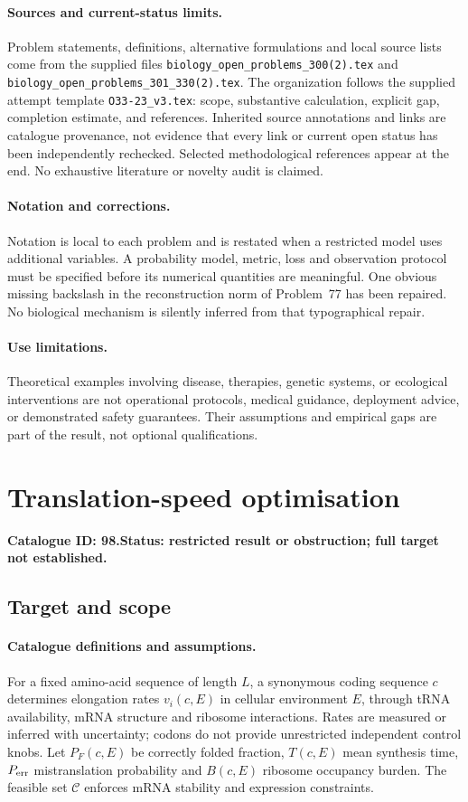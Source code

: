 \documentclass[11pt]{article}
\begin{document}
\paragraph{Sources and current-status limits.}
Problem statements, definitions, alternative formulations and local source lists
come from the supplied files
\texttt{biology\_open\_problems\_300(2).tex} and
\texttt{biology\_open\_problems\_301\_330(2).tex}.
The organization follows the supplied attempt template
\texttt{O33-23\_v3.tex}: scope, substantive calculation, explicit gap,
completion estimate, and references. Inherited source annotations and links are
catalogue provenance, not evidence that every link or current open status has
been independently rechecked. Selected methodological references appear at the
end. No exhaustive literature or novelty audit is claimed.

\paragraph{Notation and corrections.}
Notation is local to each problem and is restated when a restricted model uses
additional variables. A probability model, metric, loss and observation protocol
must be specified before its numerical quantities are meaningful. One obvious
missing backslash in the reconstruction norm of Problem~77 has been repaired.
No biological mechanism is silently inferred from that typographical repair.

\paragraph{Use limitations.}
Theoretical examples involving disease, therapies, genetic systems, or ecological
interventions are not operational protocols, medical guidance, deployment advice,
or demonstrated safety guarantees. Their assumptions and empirical gaps are part
of the result, not optional qualifications.

\setcounter{section}{97}
\section{Translation-speed optimisation}
\label{prob:098}
\noindent\textbf{Catalogue ID: 98.}\quad \textbf{Status: restricted result or obstruction; full target not established.}
\subsection{Target and scope}
\paragraph{Catalogue definitions and assumptions.}
For a fixed amino-acid sequence of length $L$, a synonymous coding sequence $c$ determines elongation rates $v_i(c,E)$ in cellular environment $E$, through tRNA availability, mRNA structure and ribosome interactions. Rates are measured or inferred with uncertainty; codons do not provide unrestricted independent control knobs. Let $P_F(c,E)$ be correctly folded fraction, $T(c,E)$ mean synthesis time, $P_{
\rm err}$ mistranslation probability and $B(c,E)$ ribosome occupancy burden. The feasible set $\mathcal C$ enforces mRNA stability and expression constraints.
\end{document}
